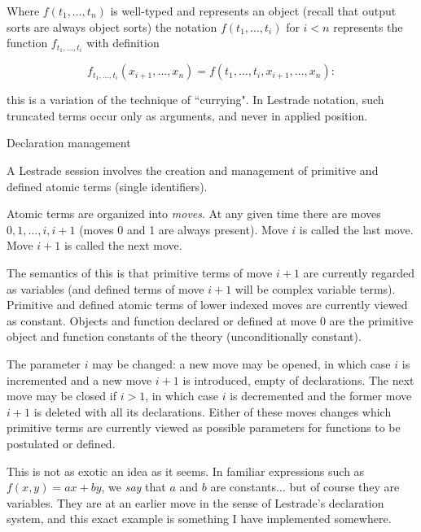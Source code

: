 \documentclass[12pt]{slides}
\begin{document}
\begin{slide}

Where $f(t_1,\ldots,t_n)$ is well-typed and represents an object (recall that output sorts are always object sorts) the notation
$f(t_1,\ldots,t_i)$ for $i<n$ represents the function $f_{t_1,\ldots,t_i}$  with definition

$$f_{t_1,\ldots,t_i}(x_{i+1},\ldots,x_n) = f(t_1,\ldots,t_i,x_{i+1},\ldots,x_n):$$

this is a variation of the technique of ``currying".  In Lestrade notation, such truncated terms occur only as arguments, and never in applied position.

\end{slide}

\begin{slide}

{\Large Declaration management}

A Lestrade session involves the creation and management of primitive and defined atomic terms (single identifiers).

Atomic terms are organized into {\em moves}.  At any given time there are moves $0,1,\ldots,i,i+1$ (moves 0 and 1 are always present).
Move $i$ is called the last move.  Move $i+1$ is called the next move.

The semantics of this is that primitive terms of move $i+1$ are currently regarded as variables (and defined terms of move $i+1$ will be complex variable terms).  Primitive and defined atomic terms of lower indexed moves are currently viewed as constant.  Objects and function declared or defined at move 0 are the primitive object and function constants of the theory (unconditionally constant).


The parameter $i$ may be changed:  a new move may be opened, in which case $i$ is incremented and a new move $i+1$ is introduced, empty
of declarations.  The next move may be closed if $i>1$, in which case $i$ is decremented and the former move $i+1$ is deleted with all its declarations.   Either of these moves changes which primitive terms are currently viewed as possible parameters for functions to be postulated or defined.




This is not as exotic an idea as it seems.  In familiar expressions such as $f(x,y)=ax+by$, we {\em say} that $a$ and $b$ are constants$\ldots$ but of course they are variables.
They are at an earlier move in the sense of Lestrade's declaration system, and this exact example is something I have implemented somewhere.

\end{slide}
\end{document}

